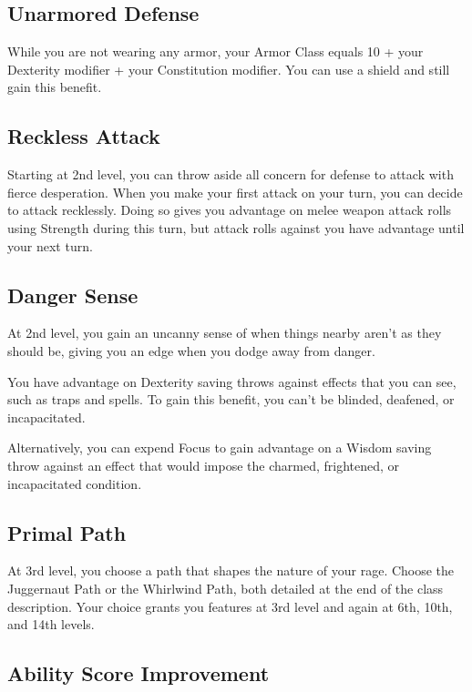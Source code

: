\subsection{Unarmored Defense}

While you are not wearing any armor, your Armor Class equals 10 + your Dexterity modifier + your Constitution modifier. You can use a shield and still gain this benefit.

\subsection{Reckless Attack}

Starting at 2nd level, you can throw aside all concern for defense to attack with fierce desperation. When you make your first attack on your turn, you can decide to attack recklessly. Doing so gives you advantage on melee weapon attack rolls using Strength during this turn, but attack rolls against you have advantage until your next turn.

\subsection{Danger Sense}

At 2nd level, you gain an uncanny sense of when things nearby aren’t as they should be, giving you an edge when you dodge away from danger.

You have advantage on Dexterity saving throws against effects that you can see, such as traps and spells. To gain this benefit, you can’t be blinded, deafened, or incapacitated.

Alternatively, you can expend Focus to gain advantage on a Wisdom saving throw against an effect that would impose the charmed, frightened, or incapacitated condition.

\subsection{Primal Path}

At 3rd level, you choose a path that shapes the nature of your rage. Choose the Juggernaut Path or the Whirlwind Path, both detailed at the end of the class description. Your choice grants you features at 3rd level and again at 6th, 10th, and 14th levels.

\subsection{Ability Score Improvement}

